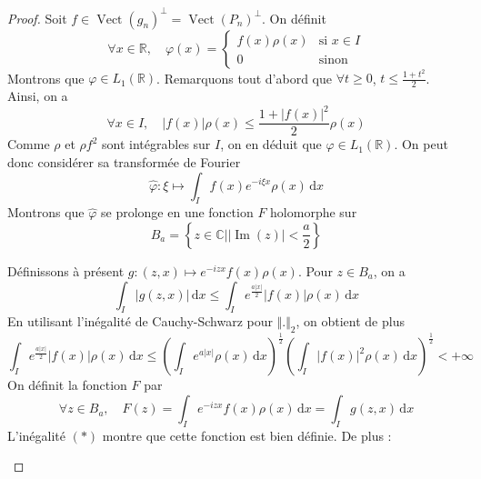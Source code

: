   \begin{proof}
    Soit $f \in \operatorname{Vect}(g_n)^\perp = \operatorname{Vect}(P_n)^\perp$. On définit
    \[
    \forall x \in \mathbb{R}, \quad \varphi(x) = \begin{cases} f(x) \rho(x) &\text{si } x \in I \\ 0 &\text{sinon} \end{cases}
    \]
    Montrons que $\varphi \in L_1(\mathbb{R})$. Remarquons tout d'abord que $\forall t \geq 0$, $t \leq \frac{1 + t^2}{2}$. Ainsi, on a
    \[ \forall x \in I, \quad |f(x)|\rho(x) \leq \frac{1 + |f(x)|^2}{2} \rho(x) \]
    Comme $\rho$ et $\rho f^2$ sont intégrables sur $I$, on en déduit que $\varphi \in L_1(\mathbb{R})$. On peut donc considérer sa transformée de Fourier
    \[ \widehat{\varphi} : \xi \mapsto \int_I f(x) e^{-i \xi x} \rho(x) \, \mathrm{d}x \]
    Montrons que $\widehat{\varphi}$ se prolonge en une fonction $F$ holomorphe sur
    \[ B_a = \left\{ z \in \mathbb{C} \mid \vert \operatorname{Im}(z) \vert < \frac{a}{2} \right\} \]
    \begin{center}
    \end{center}
    Définissons à présent $g : (z, x) \mapsto e^{-izx} f(x) \rho(x)$. Pour $z \in B_a$, on a
    \[ \int_I \vert g(z, x) \vert \, \mathrm{d}x \leq \int_I e^{\frac{a \vert x \vert}{2}} \vert f(x) \vert \rho(x) \, \mathrm{d}x \]
    En utilisant l'inégalité de Cauchy-Schwarz pour $\Vert . \Vert_2$, on obtient de plus
    \[ \int_I e^{\frac{a \vert x \vert}{2}} \vert f(x) \vert \rho(x) \, \mathrm{d}x \leq \left( \int_I e^{a \vert x \vert} \rho(x) \, \mathrm{d}x \right)^{\frac{1}{2}} \left( \int_I \vert f(x) \vert^2 \rho(x) \, \mathrm{d}x \right)^{\frac{1}{2}} < + \infty \tag{$*$} \]
    On définit la fonction $F$ par
    \[ \forall z \in B_a , \quad F(z) = \int_I e^{-izx} f(x) \rho(x) \, \mathrm{d}x = \int_I g(z, x) \, \mathrm{d}x \]
    L'inégalité $(*)$ montre que cette fonction est bien définie. De plus :
    \begin{itemize}

\end{itemize}
\end{proof}
